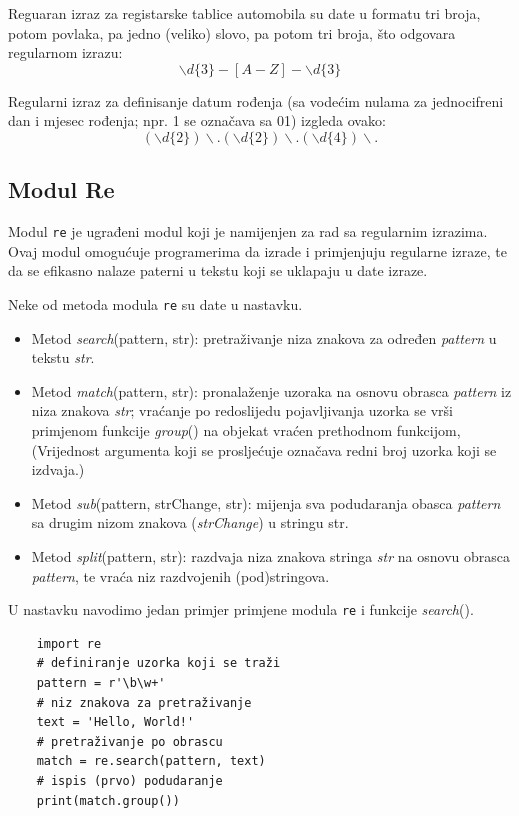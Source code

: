 Reguaran izraz za registarske tablice automobila su date u formatu tri broja, potom povlaka, pa jedno (veliko) slovo, pa potom tri broja, što odgovara regularnom izrazu:
$$ \backslash d \{3\}-[A-Z]-\backslash d\{3\}$$

Regularni izraz za definisanje datum rođenja (sa vodećim nulama za jednocifreni dan i mjesec rođenja; npr. 1 se označava sa 01) izgleda ovako:
$$(\backslash d \{2\})\backslash.(\backslash d \{2\})\backslash.(\backslash d \{4\})\backslash. $$ 

\subsection{Modul Re}
Modul \texttt{re}  je ugrađeni modul koji je namijenjen za rad sa regularnim izrazima. Ovaj modul omogućuje programerima da izrade i primjenjuju regularne izraze, te da se efikasno nalaze paterni u tekstu koji se uklapaju u date izraze. 

Neke od metoda modula \texttt{re} su date u nastavku.
\begin{itemize}
	\item Metod \textit{search}(pattern, str): pretraživanje niza znakova za određen \textit{pattern} u tekstu \textit{str}.
	\item Metod \textit{match}(pattern, str): pronalaženje  uzoraka na osnovu obrasca \textit{pattern} iz niza znakova \emph{str}; vraćanje po redoslijedu pojavljivanja   uzorka se vrši primjenom funkcije \emph{group}() na objekat vraćen prethodnom funkcijom, (Vrijednost argumenta koji se prosljećuje označava redni broj uzorka koji se izdvaja.)
	
	\item Metod \textit{sub}(pattern, strChange, str): mijenja sva podudaranja obasca \textit{pattern} sa drugim nizom znakova (\textit{strChange}) u stringu {str}.
	\item Metod \textit{split}(pattern, str): razdvaja  niza znakova stringa \emph{str} na osnovu  obrasca \emph{pattern}, te vraća niz razdvojenih (pod)stringova.
\end{itemize}
 
 U nastavku navodimo jedan primjer primjene modula \texttt{re} i funkcije \textit{search}().
 
 \begin{verbatim}
 	import re
 	# definiranje uzorka koji se traži
 	pattern = r'\b\w+'
 	# niz znakova za pretraživanje
 	text = 'Hello, World!'
 	# pretraživanje po obrascu
 	match = re.search(pattern, text)
 	# ispis (prvo) podudaranje
 	print(match.group()) 
\end{verbatim}


